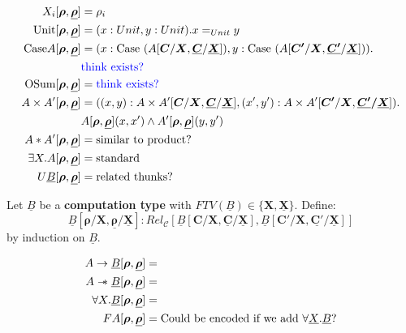 \documentclass{article}
\begin{document}
\begin{align*}
    X_i[\bm{\rho},\bm{\underline{\rho}}] &= \rho_i\\
    \textrm{Unit} [\bm{\rho},\bm{\underline{\rho}}]&= (x : Unit , y : Unit). x =_{Unit} y\\
    \textrm{Case} A [\bm{\rho},\bm{\underline{\rho}}]&= (x : \textrm{Case } (A[\bm{C}/\bm{X},\bm{\underline{C}}/\bm{\underline{X}}]),
    y : \textrm{Case } (A[\bm{C'}/\bm{X},\bm{\underline{C'}}/\bm{\underline{X}}])). 
    \\
    & \textcolor{blue}{\textrm{think exists?}}\\
    \textrm{OSum} [\bm{\rho},\bm{\underline{\rho}}]&= \textcolor{blue}{\textrm{think exists?}}\\
    A \times A' [\bm{\rho},\bm{\underline{\rho}}]&= ((x,y) : A\times A'[\bm{C}/\bm{X},\bm{\underline{C}}/\bm{\underline{X}}], (x',y') :  A \times A'[\bm{C'}/\bm{X},\bm{\underline{C'}/\bm{\underline{X}}}]).\\
    & A[\bm{\rho},\bm{\underline{\rho}}](x,x')\land A'[\bm{\rho},\bm{\underline{\rho}}](y,y') \\
    A * A' [\bm{\rho},\bm{\underline{\rho}}]&= \textrm{similar to product?}\\
    \exists X . A [\bm{\rho},\bm{\underline{\rho}}]&= \textrm{standard} \\
    U \underline{B} [\bm{\rho},\bm{\underline{\rho}}]&= \textrm{related thunks?}\\
\end{align*}

Let $\underline{B}$ be a \textbf{computation type} with $FTV(\underline{B}) \in \{\bm{X},\bm{\underline{X}}\}$. Define:
\[
  \underline{B}[\bm{\rho}/\bm{X},\bm{\underline{\rho}}/\bm{\underline{X}}] : Rel_{\mathcal{C}}[\underline{B}[\bm{C}/\bm{X},\bm{\underline{C}}/\bm{\underline{X}}], \underline{B}[\bm{C'}/\bm{X},\bm{\underline{C'}/\bm{\underline{X}}}]] 
\] 
by induction on $\underline{B}$. 

\begin{align*}
    A \rightarrow \underline{B}[\bm{\rho},\bm{\underline{\rho}}] &= \\
    A \mathrel{-\mkern-6mu*} \underline{B}[\bm{\rho},\bm{\underline{\rho}}] &= \\
    \forall X . \underline{B} [\bm{\rho},\bm{\underline{\rho}}]&= \\
    F A[\bm{\rho},\bm{\underline{\rho}}] &= \textrm{Could be encoded if we add } \forall \underline{X} . \underline{B}?\\
\end{align*}
\end{document}

